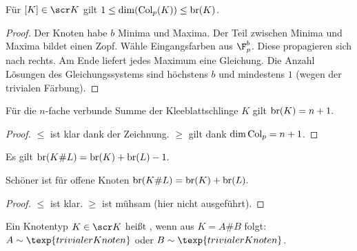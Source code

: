 \begin{st}
    Für $[K] \in \scr K$ gilt $1 \le \dim( \operatorname{Col}_p(K)) \le \operatorname { br }(K)$.
    \begin{proof}
        Der Knoten habe $b$ Minima und Maxima.
        Der Teil zwischen Minima und Maxima bildet einen Zopf.
        Wähle Eingangsfarben aus $\F_p^b$.
        Diese propagieren sich nach rechts.
        Am Ende liefert jedes Maximum eine Gleichung.
        Die Anzahl Lösungen des Gleichungssystems sind höchstens $b$ und mindestens $1$ (wegen der trivialen Färbung).
    \end{proof}
\end{st}

\begin{ex}
    Für die $n$-fache verbunde Summe der Kleeblattschlinge $K$ gilt
    \begin{math}
        \operatorname { br }(K) = n + 1.
    \end{math}
    \begin{proof}
        $\le$ ist klar dank der Zeichnung.
        $\ge$ gilt dank $\dim \operatorname{Col}_p = n + 1$.
    \end{proof}
\end{ex}

\begin{st}[Schubert 195x]
    Es gilt
    \begin{math}
        \operatorname { br }(K \# L) = \operatorname { br }(K) + \operatorname { br }(L) - 1.
    \end{math}
    \begin{note}
        Schöner ist für offene Knoten
        \begin{math}
            \operatorname { br }(K \# L) = \operatorname { br }(K) + \operatorname { br }(L).
        \end{math}
    \end{note}
    \begin{proof}
        $\le$ ist klar.
        $\ge$ ist mühsam (hier nicht ausgeführt).
    \end{proof}
\end{st}

\begin{df}
    Ein Knotentyp $K \in \scr K$ heißt , wenn aus $K = A \# B$ folgt: $A \sim \texp{trivialer Knoten}$ oder $B \sim \texp{trivialer Knoten}$.
\end{df}

